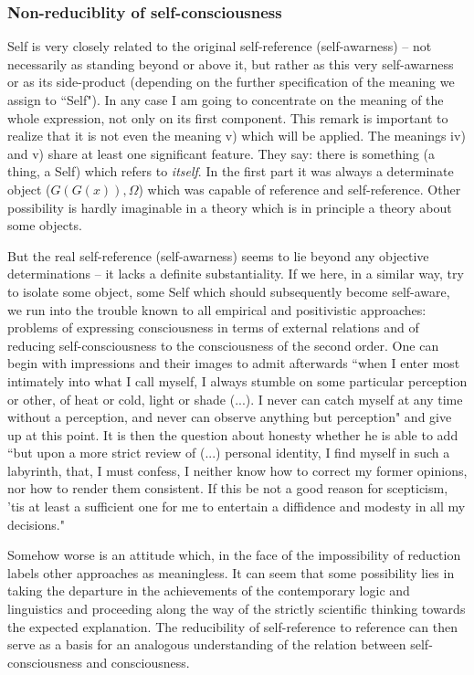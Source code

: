 \subsubsection{Non-reduciblity of self-consciousness}
Self is very closely related to the original self-reference (self-awarness) -- not necessarily as standing beyond or 
above it, but rather as this very self-awarness or as its side-product (depending on the further specification of the 
meaning we assign to ``Self"). In any case I am going to concentrate on the meaning of the whole expression, not 
only on its first component. This remark is important to realize that it is not even the meaning v) which will be 
applied. The meanings iv) and v) share at least one significant feature. They say: there is something (a thing, a 
Self) which refers to {\em itself}. In the first part it was always a determinate object 
($G(G(x)), \Omega$) which was capable of 
reference and self-reference. Other possibility is hardly imaginable in a theory which is in principle a theory about 
some objects.

But the real self-reference (self-awarness) seems to lie beyond any objective determinations -- it lacks a definite 
substantiality. If we here, in a similar way, try to isolate some object, some Self which should subsequently 
become self-aware, we run into the trouble known to all empirical and positivistic approaches: problems of 
expressing consciousness in terms of external relations and of reducing self-consciousness to the consciousness of 
the second order. One can begin with impressions and their images to admit afterwards ``when I enter most 
intimately into what I call myself, I always stumble on some particular perception or other, of heat or cold, light 
or shade (...). I never can catch myself at any time without a perception, and never can observe anything but 
perception" \cite{ToHN}  and give up at this point. It is then the question about honesty whether he is able to add ``but upon a 
more strict review of (...) personal identity, I find myself in such a labyrinth, that, I must confess, I neither know 
how to correct my former opinions, nor how to render them consistent. If this be not a good reason for scepticism, 
'tis at least a sufficient one for me to entertain a diffidence and modesty in all my decisions." \cite{ToHN} 

Somehow worse is an attitude which, in the face of the impossibility of reduction labels 
other
approaches as meaningless. It can seem that some possibility lies in taking the departure in the achievements of 
the contemporary logic and linguistics and proceeding along the way of the strictly scientific thinking towards the 
expected explanation. The reducibility of self-reference to reference can then serve as a basis for an analogous 
understanding of the relation between self-consciousness and consciousness.

